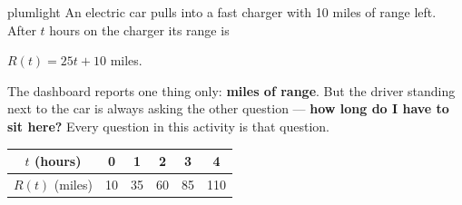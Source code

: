 \documentclass[10pt]{article}
\begin{document}

\vspace{0.12in}

\begin{scenariobox}{plumlight}
\small
An electric car pulls into a fast charger with 10 miles of range left. After
$t$ hours on the charger its range is

\begin{center}
$R(t) = 25t + 10$ \quad miles.
\end{center}

The dashboard reports one thing only: \textbf{miles of range}. But the driver
standing next to the car is always asking the other question ---
\textbf{how long do I have to sit here?} Every question in this activity is
that question.

\begin{center}
\end{center}

\renewcommand{\arraystretch}{1.3}
\begin{center}
\begin{tabular}{|c|c|c|c|c|c|}
\hline
$t$ (hours) & 0 & 1 & 2 & 3 & 4 \\
\hline
$R(t)$ (miles) & 10 & 35 & 60 & 85 & 110 \\
\hline
\end{tabular}
\end{center}
\end{scenariobox}

\vspace{0.1in}
\end{document}

